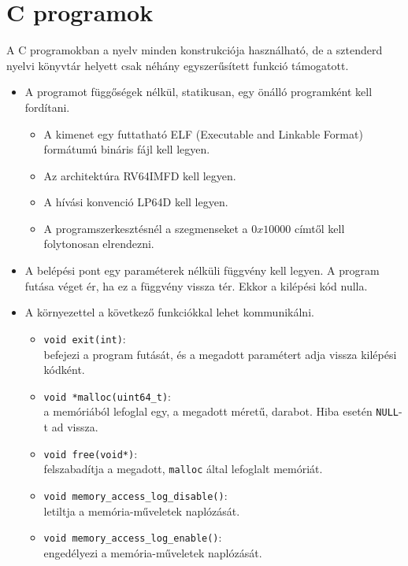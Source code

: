 \documentclass[12pt]{report}
\begin{document}
\section{C programok}

A C programokban a nyelv minden konstrukciója használható,
de a sztenderd nyelvi könyvtár helyett csak néhány egyszerűsített
funkció támogatott.
\begin{itemize}
\item A programot függőségek nélkül, statikusan, egy önálló programként kell fordítani.
\begin{itemize}
\item A kimenet egy futtatható ELF (Executable and Linkable Format) formátumú
bináris fájl kell legyen.
\item Az architektúra RV64IMFD\cite{riscv-isa} kell legyen.
\item A hívási konvenció LP64D\cite{riscv-abi} kell legyen.
\item A programszerkesztésnél a szegmenseket a $0x10000$ címtől kell
folytonosan elrendezni.
\end{itemize}

\item A belépési pont egy paraméterek nélküli függvény kell legyen.
A program futása véget ér, ha ez a függvény vissza tér.
Ekkor a kilépési kód nulla.

\item A környezettel a következő funkciókkal lehet kommunikálni.
\begin{itemize}
\item \texttt{void exit(int)}: \\
befejezi a program futását, és a megadott paramétert adja vissza kilépési kódként.

\item \texttt{void *malloc(uint64\_t)}: \\
a memóriából lefoglal egy, a megadott méretű, darabot.
Hiba esetén \texttt{NULL}-t ad vissza.

\item \texttt{void free(void*)}: \\
felszabadítja a megadott, \texttt{malloc} által lefoglalt memóriát.

\item \texttt{void memory\_access\_log\_disable()}: \\
letiltja a memória-műveletek naplózását.

\item \texttt{void memory\_access\_log\_enable()}: \\
engedélyezi a memória-műveletek naplózását.


\end{itemize}
\end{itemize}
\end{document}
